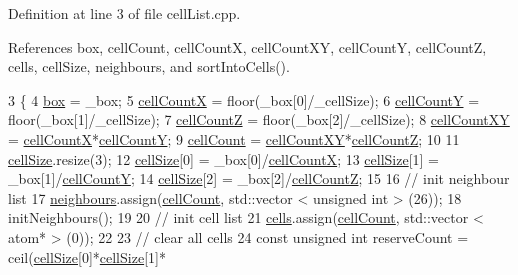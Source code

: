 Definition at line 3 of file cell\-List.\-cpp.



References box, cell\-Count, cell\-Count\-X, cell\-Count\-X\-Y, cell\-Count\-Y, cell\-Count\-Z, cells, cell\-Size, neighbours, and sort\-Into\-Cells().


\begin{DoxyCode}
3                                                                                           \{
4     \hyperlink{classcell_list_ae65748b80d5e06edfa22daaf569f2757}{box} = \_box;
5     \hyperlink{classcell_list_a342f802c342f51f3c1aa4dab7d7a4d84}{cellCountX} = floor(\_box[0]/\_cellSize);
6     \hyperlink{classcell_list_aa0c942e7b0b61cda1d688ffc96e8f1c8}{cellCountY} = floor(\_box[1]/\_cellSize);
7     \hyperlink{classcell_list_a2b506715c6ded7cb9fadf994f4f01785}{cellCountZ} = floor(\_box[2]/\_cellSize);
8     \hyperlink{classcell_list_a619d607f8569876cead1bdfad239d4b2}{cellCountXY} = \hyperlink{classcell_list_a342f802c342f51f3c1aa4dab7d7a4d84}{cellCountX}*\hyperlink{classcell_list_aa0c942e7b0b61cda1d688ffc96e8f1c8}{cellCountY};
9     \hyperlink{classcell_list_a6a695015c180229cd491db58c6e18ff4}{cellCount} = \hyperlink{classcell_list_a619d607f8569876cead1bdfad239d4b2}{cellCountXY}*\hyperlink{classcell_list_a2b506715c6ded7cb9fadf994f4f01785}{cellCountZ};
10 
11     \hyperlink{classcell_list_ac920f36bcf43f79ab853921bb0b7c2f4}{cellSize}.resize(3);
12     \hyperlink{classcell_list_ac920f36bcf43f79ab853921bb0b7c2f4}{cellSize}[0] = \_box[0]/\hyperlink{classcell_list_a342f802c342f51f3c1aa4dab7d7a4d84}{cellCountX};
13     \hyperlink{classcell_list_ac920f36bcf43f79ab853921bb0b7c2f4}{cellSize}[1] = \_box[1]/\hyperlink{classcell_list_aa0c942e7b0b61cda1d688ffc96e8f1c8}{cellCountY};
14     \hyperlink{classcell_list_ac920f36bcf43f79ab853921bb0b7c2f4}{cellSize}[2] = \_box[2]/\hyperlink{classcell_list_a2b506715c6ded7cb9fadf994f4f01785}{cellCountZ};
15 
16     \textcolor{comment}{// init neighbour list}
17     \hyperlink{classcell_list_ada607886d0e5a20d710dde694d6d989f}{neighbours}.assign(\hyperlink{classcell_list_a6a695015c180229cd491db58c6e18ff4}{cellCount}, std::vector < unsigned int > (26));
18     initNeighbours();
19 
20     \textcolor{comment}{// init cell list}
21     \hyperlink{classcell_list_a10bc0c3ae819293b1e88bc7d1bfdb2aa}{cells}.assign(\hyperlink{classcell_list_a6a695015c180229cd491db58c6e18ff4}{cellCount}, std::vector < atom* > (0));
22 
23     \textcolor{comment}{// clear all cells}
24     \textcolor{keyword}{const} \textcolor{keywordtype}{unsigned} \textcolor{keywordtype}{int} reserveCount = ceil(\hyperlink{classcell_list_ac920f36bcf43f79ab853921bb0b7c2f4}{cellSize}[0]*\hyperlink{classcell_list_ac920f36bcf43f79ab853921bb0b7c2f4}{cellSize}[1]*

\end{DoxyCode}
